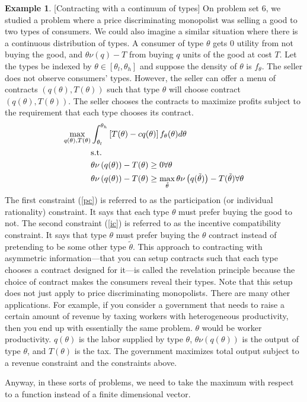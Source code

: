 \documentclass[12pt,reqno]{amsart}
\theoremstyle{definition}
\newtheorem{example}{Example}[section]
\begin{document}
\begin{example}\label{ex:contract}[Contracting with a continuum of
  types]
  On problem set 6, we studied a problem where a price discriminating
  monopolist was selling a good to two types of consumers. We could
  also imagine a similar situation where there is a continuous
  distribution of types. A consumer of type $\theta$ gets $0$ utility
  from not buying the good, and $\theta \nu(q) - T$ from buying $q$
  units of the good at cost $T$. Let the types be indexed by $\theta \in
  [\theta_l,\theta_h]$ and suppose the density of $\theta$ is $f_\theta$. The
  seller does not observe consumers' types. However, the seller can
  offer a menu of contracts $(q(\theta),T(\theta))$ such that type
  $\theta$ will choose contract $(q(\theta),T(\theta))$. The seller
  chooses the contracts to maximize profits subject to the requirement
  that each type chooses its contract.
  \begin{align}
    \max_{q(\theta),T(\theta)} & \int_{\theta_l}^{\theta_h} 
    \left[T(\theta) - cq(\theta)\right]
    f_\theta(\theta) d\theta \notag \\
    & \text{s.t.} \notag \\
    &\theta \nu\left(q(\theta)\right) - T(\theta) \geq 0  \forall
    \theta \label{pc} \\
    &\theta \nu\left(q(\theta)\right) - T(\theta) \geq
    \max_{\tilde{\theta}} \theta \nu\left(q(\tilde{\theta}) \right) -
    T(\tilde{\theta}) \forall \theta \label{ic} 
  \end{align}
  The first constraint (\ref{pc}) is referred to as the participation
  (or individual rationality)
  constraint. It says that each type $\theta$ must prefer buying the
  good to not. The second constraint  (\ref{ic}) is referred to as the
  incentive compatibility constraint. It says that type $\theta$ must
  prefer buying the $\theta$ contract instead of pretending to be
  some other type $\tilde{\theta}$. This approach to contracting with
  asymmetric information---that you can setup contracts such that each
  type chooses a contract designed for it---is called the revelation
  principle because the choice of contract makes the consumers reveal
  their types. Note that this setup does not just apply to price
  discriminating monopolists. There are many other applications. For
  example, if you consider a government that needs to raise a certain
  amount of revenue by taxing workers with heterogeneous productivity,
  then you end up with essentially the same problem. $\theta$ would be
  worker productivity. $q(\theta)$ is the labor supplied by type
  $\theta$, $\theta \nu(q(\theta))$ is the output of type $\theta$,
  and $T(\theta)$ is the tax. The government maximizes total output
  subject to a revenue constraint and the constraints above. 
  
  Anyway, in these sorts of problems, we need to take the maximum with
  respect to a function instead of a finite dimensional vector. 
\end{example}
\end{document}
